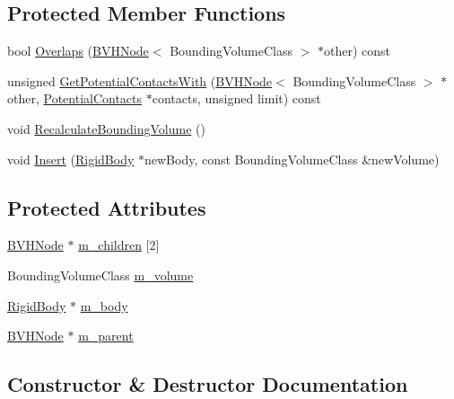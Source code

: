 \subsection*{Protected Member Functions}
\begin{DoxyCompactItemize}
\item 
bool \hyperlink{classrum_1_1_b_v_h_node_a4d60cfdfc53028f0a567fe5f5c316848}{Overlaps} (\hyperlink{classrum_1_1_b_v_h_node}{B\+V\+H\+Node}$<$ Bounding\+Volume\+Class $>$ $\ast$other) const
\item 
unsigned \hyperlink{classrum_1_1_b_v_h_node_a51c82ced5651f99e338bd0ce71700ca6}{Get\+Potential\+Contacts\+With} (\hyperlink{classrum_1_1_b_v_h_node}{B\+V\+H\+Node}$<$ Bounding\+Volume\+Class $>$ $\ast$other, \hyperlink{structrum_1_1_potential_contacts}{Potential\+Contacts} $\ast$contacts, unsigned limit) const
\item 
void \hyperlink{classrum_1_1_b_v_h_node_a8cd9eb8eaf308170ae0350a617210096}{Recalculate\+Bounding\+Volume} ()
\item 
void \hyperlink{classrum_1_1_b_v_h_node_ab74f21c80eb2ad8087b9b897fd3dccd4}{Insert} (\hyperlink{classrum_1_1_rigid_body}{Rigid\+Body} $\ast$new\+Body, const Bounding\+Volume\+Class \&new\+Volume)
\end{DoxyCompactItemize}
\subsection*{Protected Attributes}
\begin{DoxyCompactItemize}
\item 
\hyperlink{classrum_1_1_b_v_h_node}{B\+V\+H\+Node} $\ast$ \hyperlink{classrum_1_1_b_v_h_node_a681ca4a3084ba34bd54c546a7ef2a36c}{m\+\_\+children} \mbox{[}2\mbox{]}
\item 
Bounding\+Volume\+Class \hyperlink{classrum_1_1_b_v_h_node_aae21162bff289e2d0d502c9360d0f36c}{m\+\_\+volume}
\item 
\hyperlink{classrum_1_1_rigid_body}{Rigid\+Body} $\ast$ \hyperlink{classrum_1_1_b_v_h_node_a24954eb90f55a8a29c6459706554c9d6}{m\+\_\+body}
\item 
\hyperlink{classrum_1_1_b_v_h_node}{B\+V\+H\+Node} $\ast$ \hyperlink{classrum_1_1_b_v_h_node_ae69483db4fada9afde3a31393243a87d}{m\+\_\+parent}
\end{DoxyCompactItemize}


\subsection{Constructor \& Destructor Documentation}
\mbox{\label{classrum_1_1_b_v_h_node_aca2a55118d5c021f92b8e0105fa32625}} 
